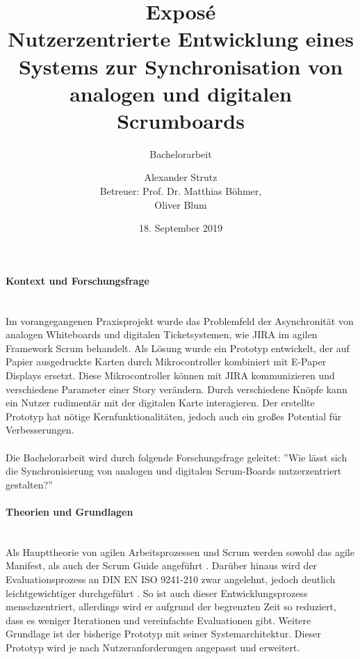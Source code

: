 \documentclass[12pt,titlepage]{scrartcl}
\begin{document}
	\begin{titlepage}
		\title{Exposé \\ \glqq Nutzerzentrierte Entwicklung eines Systems zur Synchronisation von analogen und digitalen Scrumboards\grqq{}} 
		\subtitle{Bachelorarbeit}
		\author{Alexander Strutz \vspace{0.5cm}\\ Betreuer: 
		Prof. Dr. Matthias Böhmer,\\Oliver Blum}
 		\date{18. September 2019}
		\maketitle
	\end{titlepage}
	\paragraph{Kontext und Forschungsfrage} \leavevmode \\
	Im vorangegangenen Praxisprojekt wurde das Problemfeld der Asynchronität von analogen Whiteboards und digitalen Ticketsystemen, wie JIRA im agilen Framework Scrum behandelt. Als Lösung wurde ein Prototyp entwickelt, der auf Papier ausgedruckte Karten durch Mikrocontroller kombiniert mit E-Paper Displays ersetzt. Diese Mikrocontroller können mit JIRA kommunizieren und verschiedene Parameter einer Story verändern. Durch verschiedene Knöpfe kann ein Nutzer rudimentär mit der digitalen Karte interagieren. Der erstellte Prototyp hat nötige Kernfunktionalitäten, jedoch auch ein großes Potential für Verbesserungen. \\ \\
	Die Bachelorarbeit wird durch folgende Forschungsfrage geleitet: ''Wie lässt sich die Synchronisierung von analogen und digitalen Scrum-Boards nutzerzentriert gestalten?''
	\paragraph{Theorien und Grundlagen} \leavevmode \\
	Als Haupttheorie von agilen Arbeitsprozessen und Scrum werden sowohl das agile Manifest, als auch der Scrum Guide angeführt \cite{guide}. Darüber hinaus wird der Evaluationsprozess an DIN EN ISO 9241-210 zwar angelehnt, jedoch deutlich leichtgewichtiger durchgeführt \cite{ISO9241-210 }. So ist auch dieser Entwicklungsprozess menschzentriert, allerdings wird er aufgrund der begrenzten Zeit so reduziert, dass es weniger Iterationen und vereinfachte Evaluationen gibt. Weitere Grundlage ist der bisherige Prototyp mit seiner Systemarchitektur. Dieser Prototyp wird je nach Nutzeranforderungen angepasst und erweitert. 
\end{document}
